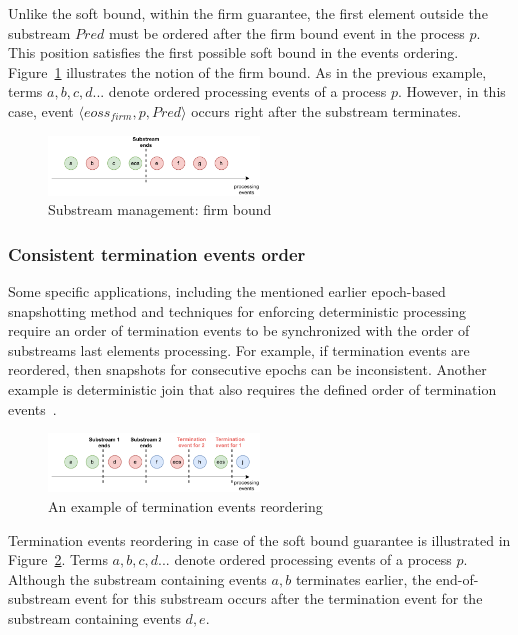 Unlike the soft bound, within the firm guarantee, the first element outside the substream $Pred$ must be ordered after the firm bound event in the process $p$. This position satisfies the first possible soft bound in the events ordering. Figure~\ref{strict_guarantees} illustrates the notion of the firm bound. As in the previous example, terms $a,b,c,d...$ denote ordered processing events of a process $p$. However, in this case, event $\langle eoss_{firm}, p, Pred\rangle$ occurs right after the substream terminates.

\begin{figure}[t]
  \centering
  \includegraphics[width=0.50\textwidth]{pics/strict-guarantee.pdf}
  \caption{Substream management: firm bound}
  \label{strict_guarantees}
\end{figure}

\subsubsection{Consistent termination events order}
Some specific applications, including the mentioned earlier epoch-based snapshotting method and techniques for enforcing deterministic processing~\cite{we2018adbis} require an order of termination events to be synchronized with the order of substreams last elements processing. For example, if termination events are reordered, then snapshots for consecutive epochs can be inconsistent. Another example is deterministic join that also requires the defined order of termination events~\cite{gulisano2016scalejoin}.

\begin{figure}[htbp]
  \centering
  \includegraphics[width=0.50\textwidth]{pics/notifications-reordering.pdf}
  \caption{An example of termination events reordering}
  \label{notifications_reordering}
\end{figure}

Termination events reordering in case of the soft bound guarantee is illustrated in Figure~\ref{notifications_reordering}. Terms $a,b,c,d...$ denote ordered processing events of a process $p$. Although the substream containing events $a,b$ terminates earlier, the end-of-substream event for this substream occurs after the termination event for the substream containing events $d,e$. 

